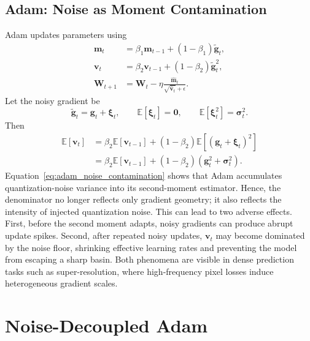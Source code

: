 \documentclass[journal]{IEEEtran}
\begin{document}
\subsection{Adam: Noise as Moment Contamination}
Adam updates parameters using
\begin{align}
    \boldsymbol{m}_t
    &=
    \beta_1\boldsymbol{m}_{t-1}
    +
    (1-\beta_1)\tilde{\boldsymbol{g}}_t,\\
    \boldsymbol{v}_t
    &=
    \beta_2\boldsymbol{v}_{t-1}
    +
    (1-\beta_2)\tilde{\boldsymbol{g}}_t^2,\\
    \boldsymbol{W}_{t+1}
    &=
    \boldsymbol{W}_{t}
    -
    \eta
    \frac{\hat{\boldsymbol{m}}_t}
    {\sqrt{\hat{\boldsymbol{v}}_t}+\epsilon}.
\end{align}
Let the noisy gradient be
\begin{equation}
    \tilde{\boldsymbol{g}}_t
    =
    \boldsymbol{g}_t
    +
    \boldsymbol{\xi}_t,
    \qquad
    \mathbb{E}[\boldsymbol{\xi}_t]=\mathbf{0},
    \qquad
    \mathbb{E}[\boldsymbol{\xi}_t^2]=\boldsymbol{\sigma}_{t}^{2}.
\end{equation}
Then
\begin{equation}
\begin{aligned}
    \mathbb{E}[\boldsymbol{v}_t]
    &=
    \beta_2\mathbb{E}[\boldsymbol{v}_{t-1}]
    +
    (1-\beta_2)
    \mathbb{E}
    [
    (
    \boldsymbol{g}_t+\boldsymbol{\xi}_t
    )^2
    ]\\
    &=
    \beta_2\mathbb{E}[\boldsymbol{v}_{t-1}]
    +
    (1-\beta_2)
    (
    \boldsymbol{g}_t^2
    +
    \boldsymbol{\sigma}_{t}^{2}
    ).
\end{aligned}
\label{eq:adam_noise_contamination}
\end{equation}
Equation~\eqref{eq:adam_noise_contamination} shows that Adam accumulates quantization-noise variance into its second-moment estimator. Hence, the denominator no longer reflects only gradient geometry; it also reflects the intensity of injected quantization noise. This can lead to two adverse effects. First, before the second moment adapts, noisy gradients can produce abrupt update spikes. Second, after repeated noisy updates, $\boldsymbol{v}_t$ may become dominated by the noise floor, shrinking effective learning rates and preventing the model from escaping a sharp basin. Both phenomena are visible in dense prediction tasks such as super-resolution, where high-frequency pixel losses induce heterogeneous gradient scales.

\section{Noise-Decoupled Adam}
\end{document}
